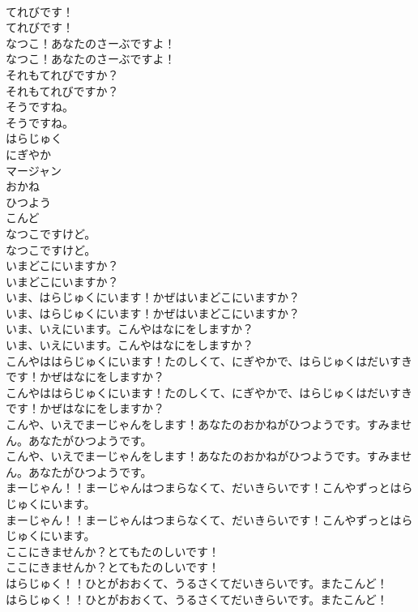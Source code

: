\documentclass[8pt]{extreport}
\begin{document}
\begin{CJK}{UTF8}{min}
\\	てれびです！	
\\	てれびです！ 
\\	なつこ！あなたのさーぶですよ！	
\\	なつこ！あなたのさーぶですよ！ 
\\	それもてれびですか？	
\\	それもてれびですか？ 
\\	そうですね。	
\\	そうですね。 
\\	はらじゅく
\\	にぎやか
\\	マージャン
\\	おかね
\\	ひつよう
\\	こんど
\\	なつこですけど。	
\\	なつこですけど。 
\\	いまどこにいますか？	
\\	いまどこにいますか？ 
\\	いま、はらじゅくにいます！かぜはいまどこにいますか？	
\\	いま、はらじゅくにいます！かぜはいまどこにいますか？ 
\\	いま、いえにいます。こんやはなにをしますか？	
\\	いま、いえにいます。こんやはなにをしますか？ 
\\	こんやははらじゅくにいます！たのしくて、にぎやかで、はらじゅくはだいすきです！かぜはなにをしますか？	
\\	こんやははらじゅくにいます！たのしくて、にぎやかで、はらじゅくはだいすきです！かぜはなにをしますか？ 
\\	こんや、いえでまーじゃんをします！あなたのおかねがひつようです。すみません。あなたがひつようです。	
\\	こんや、いえでまーじゃんをします！あなたのおかねがひつようです。すみません。あなたがひつようです。 
\\	まーじゃん！！まーじゃんはつまらなくて、だいきらいです！こんやずっとはらじゅくにいます。	
\\	まーじゃん！！まーじゃんはつまらなくて、だいきらいです！こんやずっとはらじゅくにいます。 
\\	ここにきませんか？とてもたのしいです！	
\\	ここにきませんか？とてもたのしいです！ 
\\	はらじゅく！！ひとがおおくて、うるさくてだいきらいです。またこんど！	
\\	はらじゅく！！ひとがおおくて、うるさくてだいきらいです。またこんど！ 

\end{CJK}
\end{document}
